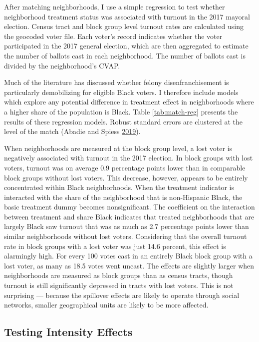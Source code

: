\documentclass[12pt,]{article}
\begin{document}
After matching neighborhoods, I use a simple regression to test whether neighborhood treatment status was associated with turnout in the 2017 mayoral election. Census tract and block group level turnout rates are calculated using the geocoded voter file. Each voter's record indicates whether the voter participated in the 2017 general election, which are then aggregated to estimate the number of ballots cast in each neighborhood. The number of ballots cast is divided by the neighborhood's CVAP.

Much of the literature has discussed whether felony disenfranchisement is particularly demobilizing for eligible Black voters. I therefore include models which explore any potential difference in treatment effect in neighborhoods where a higher share of the population is Black. Table \ref{tab:match-reg} presents the results of these regression models. Robust standard errors are clustered at the level of the match (Abadie and Spiess \protect\hyperlink{ref-Abadie2019}{2019}).



When neighborhoods are measured at the block group level, a lost voter is negatively associated with turnout in the 2017 election. In block groups with lost voters, turnout was on average 0.9 percentage points lower than in comparable block groups without lost voters. This decrease, however, appears to be entirely concentrated within Black neighborhoods. When the treatment indicator is interacted with the share of the neighborhood that is non-Hispanic Black, the basic treatment dummy becomes nonsignificant. The coefficient on the interaction between treatment and share Black indicates that treated neighborhoods that are largely Black saw turnout that was as much as 2.7 percentage points lower than similar neighborhoods without lost voters. Considering that the overall turnout rate in block groups with a lost voter was just 14.6 percent, this effect is alarmingly high. For every 100 votes cast in an entirely Black block group with a lost voter, as many as 18.5 votes went uncast. The effects are slightly larger when neighborhoods are measured as block groups than as census tracts, though turnout is still significantly depressed in tracts with lost voters. This is not surprising --- because the spillover effects are likely to operate through social networks, smaller geographical units are likely to be more affected.

\hypertarget{testing-intensity-effects}{%
\subsection*{Testing Intensity Effects}\label{testing-intensity-effects}}
\end{document}
